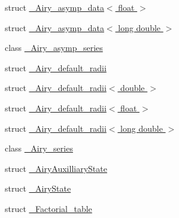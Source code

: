 \begin{DoxyCompactItemize}
\item 
struct \hyperlink{structstd_1_1____detail_1_1__Airy__asymp__data_3_01float_01_4}{\+\_\+\+Airy\+\_\+asymp\+\_\+data$<$ float $>$}
\item 
struct \hyperlink{structstd_1_1____detail_1_1__Airy__asymp__data_3_01long_01double_01_4}{\+\_\+\+Airy\+\_\+asymp\+\_\+data$<$ long double $>$}
\item 
class \hyperlink{classstd_1_1____detail_1_1__Airy__asymp__series}{\+\_\+\+Airy\+\_\+asymp\+\_\+series}
\item 
struct \hyperlink{structstd_1_1____detail_1_1__Airy__default__radii}{\+\_\+\+Airy\+\_\+default\+\_\+radii}
\item 
struct \hyperlink{structstd_1_1____detail_1_1__Airy__default__radii_3_01double_01_4}{\+\_\+\+Airy\+\_\+default\+\_\+radii$<$ double $>$}
\item 
struct \hyperlink{structstd_1_1____detail_1_1__Airy__default__radii_3_01float_01_4}{\+\_\+\+Airy\+\_\+default\+\_\+radii$<$ float $>$}
\item 
struct \hyperlink{structstd_1_1____detail_1_1__Airy__default__radii_3_01long_01double_01_4}{\+\_\+\+Airy\+\_\+default\+\_\+radii$<$ long double $>$}
\item 
class \hyperlink{classstd_1_1____detail_1_1__Airy__series}{\+\_\+\+Airy\+\_\+series}
\item 
struct \hyperlink{structstd_1_1____detail_1_1__AiryAuxilliaryState}{\+\_\+\+Airy\+Auxilliary\+State}
\item 
struct \hyperlink{structstd_1_1____detail_1_1__AiryState}{\+\_\+\+Airy\+State}
\item 
struct \hyperlink{structstd_1_1____detail_1_1__Factorial__table}{\+\_\+\+Factorial\+\_\+table}
\end{DoxyCompactItemize}
